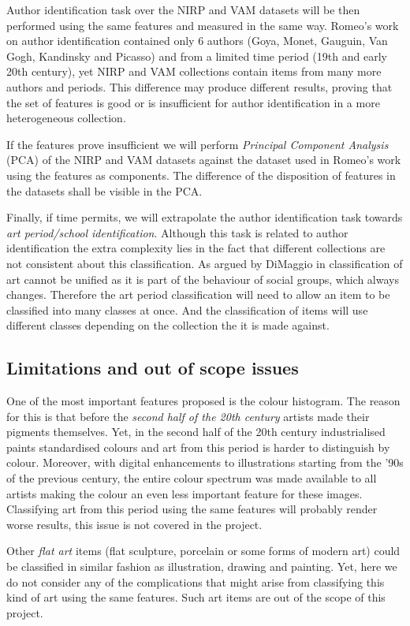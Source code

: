 \documentclass[a4paper]{article}
\begin{document}
Author identification task over the NIRP and VAM datasets will be then
performed using the same features and measured in the same way.  Romeo's work
on author identification contained only 6 authors (Goya, Monet, Gauguin, Van
Gogh, Kandinsky and Picasso) and from a limited time period (19th and early
20th century), yet NIRP and VAM collections contain items from many more
authors and periods.  This difference may produce different results, proving
that the set of features is good or is insufficient for author identification
in a more heterogeneous collection.


If the features prove insufficient we will perform \emph{Principal Component
Analysis} (PCA) of the NIRP and VAM datasets against the dataset used in
Romeo's work using the features as components.  The difference of the
disposition of features in the datasets shall be visible in the PCA.

Finally, if time permits, we will extrapolate the author identification task
towards \emph{art period/school identification}.  Although this task is related
to author identification the extra complexity lies in the fact that different
collections are not consistent about this classification.  As argued by
DiMaggio in \cite{dimaggio87art} classification of art cannot be unified as it
is part of the behaviour of social groups, which always changes.  Therefore the
art period classification will need to allow an item to be classified into many
classes at once.  And the classification of items will use different classes
depending on the collection the it is made against.

\subsection{Limitations and out of scope issues}

One of the most important features proposed is the colour histogram.  The
reason for this is that before the \emph{second half of the 20th century}
artists made their pigments themselves.  Yet, in the second half of the 20th
century industrialised paints standardised colours and art from this period is
harder to distinguish by colour.  Moreover, with digital enhancements to
illustrations starting from the '90s of the previous century, the entire colour
spectrum was made available to all artists making the colour an even less
important feature for these images.  Classifying art from this period using the
same features will probably render worse results, this issue is not covered in
the project.

Other \emph{flat art} items (flat sculpture, porcelain or some forms of modern
art) could be classified in similar fashion as illustration, drawing and
painting.  Yet, here we do not consider any of the complications that might
arise from classifying this kind of art using the same features.  Such art
items are out of the scope of this project.



\end{document}
